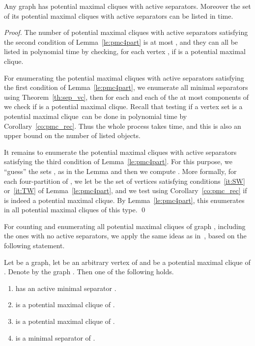 \documentclass{llncs}
\newcommand{\pmc}{potential maximal clique}
\begin{document}
\begin{theorem}\label{th:pmca_vc}
Any graph  has  \pmc s with active separators. Moreover the set of its \pmc s with active separators can be listed in  time.
\end{theorem}
\begin{proof}
The number of \pmc s with active separators satisfying the second condition of Lemma~\ref{le:pmc4part} is at most , and they can all be listed in polynomial time by checking, for each vertex , if  is a \pmc.

For enumerating the \pmc s with active separators satisfying the first condition of Lemma~\ref{le:pmc4part}, we enumerate all minimal separators  using Theorem~\ref{th:sep_vc}, then 
for each  and each of the at most  components  of  we check if  is a \pmc. Recall that testing if a vertex set is a \pmc\ can be done in polynomial 
time by Corollary~\ref{co:pmc_rec}. Thus the whole process takes  time, and this is also an upper bound on the number of listed objects.

It remains to enumerate the \pmc s with active separators satisfying the third condition of Lemma~\ref{le:pmc4part}. For this purpose, we ``guess'' the sets  ,  as in the Lemma and then we compute . More formally, for each four-partition  of , we let  be the set of vertices  satisfying conditions~\ref{it:SW} or~\ref{it:TW} of Lemma~\ref{le:pmc4part}, and we test using Corollary~\ref{co:pmc_rec} if  is indeed a \pmc. By Lemma~\ref{le:pmc4part}, this enumerates in  all \pmc s of this type. 
\qed
\end{proof}


For counting and enumerating all \pmc s of graph , including the ones with no active separators, we apply the same ideas as in~\cite{BoTo02}, based on the following statement.


\begin{proposition}\label{pr:pmc_a}
Let  be a graph, let  be an arbitrary vertex of  and  be a potential maximal clique of . Denote by  the graph . Then one of the following holds.
\begin{enumerate}
\item\label{it:active}  has an active minimal separator .
\item\label{it:witha}  is a potential maximal clique of .
\item\label{it:minusa}  is a potential maximal clique of .
\item\label{it:minsep}  is a minimal separator of .
\end{enumerate}
\end{proposition}
\end{document}
